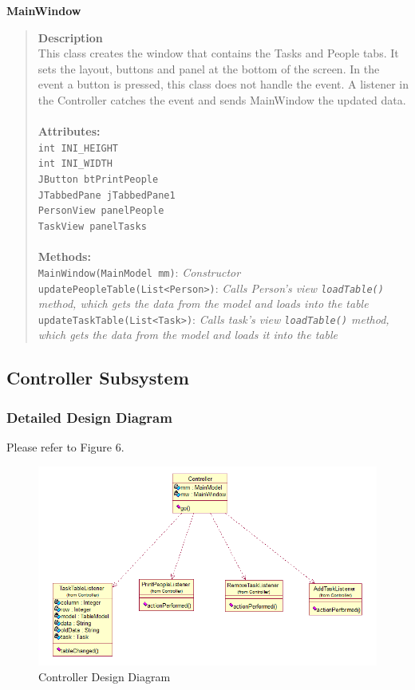 \documentclass[12pt]{article}
\begin{document}
{\bf MainWindow}
\begin{quote}
{\bf Description}\\
This class creates the window that contains the Tasks and People tabs.  It sets the layout, buttons and panel at the bottom of the screen. In the event a button is pressed, this class does not handle the event.  A listener in the Controller catches the event and sends MainWindow the updated data.\\\\
{\bf Attributes:}\\
\texttt{int INI\_HEIGHT}\\
\texttt{int INI\_WIDTH}\\
\texttt{JButton btPrintPeople}\\
\texttt{JTabbedPane jTabbedPane1}\\
\texttt{PersonView panelPeople}\\
\texttt{TaskView panelTasks}\\\\
{\bf Methods:}\\
\texttt{MainWindow(MainModel mm)}:  \emph{Constructor}\\
\texttt{updatePeopleTable(List<Person>)}:  \emph{Calls Person's view \texttt{loadTable()} method, which gets the data from the model and loads into the table}\\
\texttt{updateTaskTable(List<Task>)}: \emph{Calls task's view \texttt{loadTable()} method, which gets the data from the model and loads it into the table}
\end{quote}

\subsection{Controller Subsystem}

\subsubsection{Detailed Design Diagram}

Please refer to Figure 6.

\begin{figure}[htbp]
\begin{center} \includegraphics[scale=.55]{Diagrams/controller_diagram.png} \end{center}
\caption{Controller Design Diagram}
\label{fig:model-diagram}
\end{figure}
\end{document}
